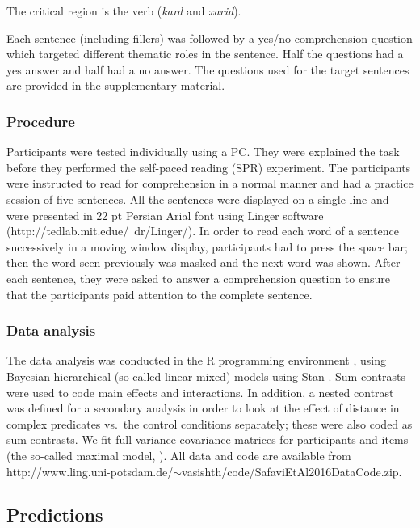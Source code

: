 \documentclass{frontiersSCNS}\usepackage{knitr} %
\begin{document}
The critical region is the verb  (\textit{kard} and \textit{xarid}).

Each sentence (including fillers) was followed by a yes/no comprehension question which targeted different thematic roles in the sentence. Half the questions had a yes answer and half had a no answer. The questions used for the target sentences are provided in the supplementary material.

\subsubsection{Procedure}

Participants were tested individually using a PC. They were explained the task before they performed the self-paced reading (SPR) experiment. The participants were instructed to read for comprehension in a normal manner and had a practice session of five sentences. All the sentences were displayed on a single line and were presented in 22 pt Persian Arial font using Linger software (http://tedlab.mit.edue/~dr/Linger/). In order to read each word of a sentence successively in a moving window display, participants had to press the space bar; then the word seen previously was masked and the next word was shown. After each sentence, they were asked to answer a comprehension question to ensure that the participants paid attention to the complete sentence.

\subsubsection{Data analysis}

The data analysis was conducted in the R programming environment \citep{R}, using Bayesian hierarchical (so-called linear mixed) models using Stan \citep{rstanarm2016,stan-manual:2014}.
Sum contrasts were used to code main effects and interactions.
In addition, a nested contrast was defined for a secondary analysis in order to look at the effect of distance in complex predicates vs.\ the control conditions separately; these were also coded as sum contrasts. We fit full variance-covariance matrices for participants and items (the so-called maximal model, \citealp{barr2013random,BatesEtAlParsimonious}).
All data and code are available from 
http://www.ling.uni-potsdam.de/$\sim$vasishth/code/SafaviEtAl2016DataCode.zip.




\subsection{Predictions}
\end{document}
